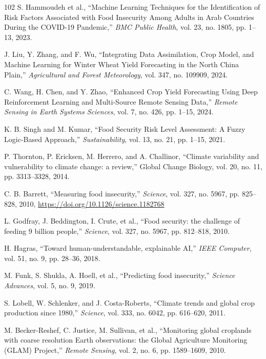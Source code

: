 \documentclass[preprint,12pt]{elsarticle}
\begin{document}
\begin{thebibliography}{102}
		S. Hammoudeh et al., ``Machine Learning Techniques for the Identification of Risk Factors Associated with Food Insecurity Among Adults in Arab Countries During the COVID-19 Pandemic,'' \emph{BMC Public Health}, vol. 23, no. 1805, pp. 1--13, 2023.
		
		J. Liu, Y. Zhang, and F. Wu, ``Integrating Data Assimilation, Crop Model, and Machine Learning for Winter Wheat Yield Forecasting in the North China Plain,'' \emph{Agricultural and Forest Meteorology}, vol. 347, no. 109909, 2024.
		
		C. Wang, H. Chen, and Y. Zhao, ``Enhanced Crop Yield Forecasting Using Deep Reinforcement Learning and Multi-Source Remote Sensing Data,'' \emph{Remote Sensing in Earth Systems Sciences}, vol. 7, no. 426, pp. 1--15, 2024.
		
		K. B. Singh and M. Kumar, ``Food Security Risk Level Assessment: A Fuzzy Logic-Based Approach,'' \emph{Sustainability}, vol. 13, no. 21, pp. 1--15, 2021.
		
		P. Thornton, P. Ericksen, M. Herrero, and A. Challinor, ``Climate variability and vulnerability to climate change: a review,'' Global Change Biology, vol. 20, no. 11, pp. 3313--3328, 2014.
		
		C. B. Barrett, ``Measuring food insecurity,'' \emph{Science}, vol. 327, no. 5967, pp. 825--828, 2010, \url{https://doi.org/10.1126/science.1182768}
		
		L. Godfray, J. Beddington, I. Crute, et al., ``Food security: the challenge of feeding 9 billion people,'' \emph{Science}, vol. 327, no. 5967, pp. 812--818, 2010.
		
		H. Hagras, ``Toward human-understandable, explainable AI,'' \emph{IEEE Computer}, vol. 51, no. 9, pp. 28--36, 2018.
		
		M. Funk, S. Shukla, A. Hoell, et al., ``Predicting food insecurity,'' \emph{Science Advances}, vol. 5, no. 9, 2019.
		
		S. Lobell, W. Schlenker, and J. Costa-Roberts, ``Climate trends and global crop production since 1980,'' \emph{Science}, vol. 333, no. 6042, pp. 616--620, 2011.
		
		M. Becker-Reshef, C. Justice, M. Sullivan, et al., ``Monitoring global croplands with coarse resolution Earth observations: the Global Agriculture Monitoring (GLAM) Project,'' \emph{Remote Sensing}, vol. 2, no. 6, pp. 1589--1609, 2010.
		

\end{thebibliography}
\end{document}
